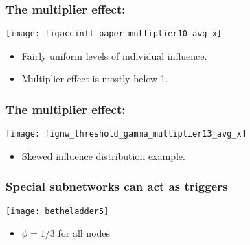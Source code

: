 \begin{frame}
    \frametitle{The multiplier effect:}


  
    \begin{block}{}
      \centering
      \texttt{[image: figaccinfl\_paper\_multiplier10\_avg\_x]}

      \begin{itemize}
      \item Fairly uniform levels of individual influence.
      \item Multiplier effect is mostly below 1.
      \end{itemize}
    \end{block}

    


\end{frame}

\begin{frame}
    \frametitle{The multiplier effect:}

    \begin{block}{}
      \centering
      \texttt{[image: fignw\_threshold\_gamma\_multiplier13\_avg\_x]}

      \begin{itemize}
      \item Skewed influence distribution example.
      \end{itemize}
    \end{block}
    


\end{frame}






\begin{frame}
  \frametitle{Special subnetworks can act as triggers}

  \begin{block}{}
    \texttt{[image: betheladder5]}
    \begin{itemize}
    \item $\phi=1/3$ for all nodes
    \end{itemize}
  \end{block}
  
  
\end{frame}


